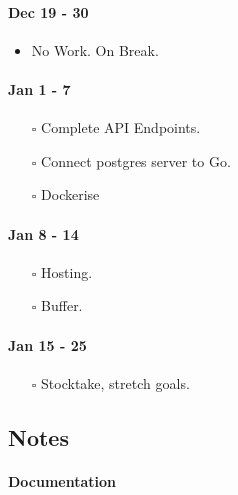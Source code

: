 \documentclass[10pt]{exam}
\providecommand{\tightlist}{%
  \setlength{\itemsep}{0pt}\setlength{\parskip}{0pt}}
\begin{document}
\hypertarget{dec-19---30}{%
\paragraph{Dec 19 - 30}\label{dec-19---30}}

\begin{itemize}
\tightlist
\item
  No Work. On Break.
\end{itemize}

\hypertarget{jan-1---7}{%
\paragraph{Jan 1 - 7}\label{jan-1---7}}

\begin{itemize}
\tightlist
\item[$\square$]
  Complete API Endpoints.
\item[$\square$]
  Connect postgres server to Go.
\item[$\square$]
  Dockerise
\end{itemize}

\hypertarget{jan-8---14}{%
\paragraph{Jan 8 - 14}\label{jan-8---14}}

\begin{itemize}
\tightlist
\item[$\square$]
  Hosting.
\item[$\square$]
  Buffer.
\end{itemize}

\hypertarget{jan-15---25}{%
\paragraph{Jan 15 - 25}\label{jan-15---25}}

\begin{itemize}
\tightlist
\item[$\square$]
  Stocktake, stretch goals.
\end{itemize}

\hypertarget{notes}{%
\subsection{Notes}\label{notes}}

\hypertarget{documentation}{%
\paragraph{Documentation}\label{documentation}}
\end{document}
